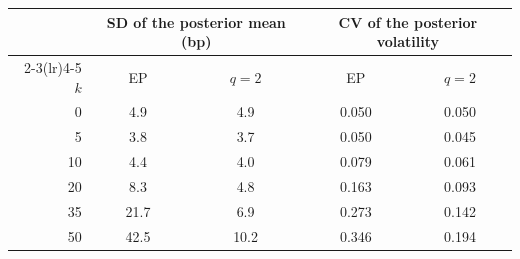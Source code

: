 \begin{tabular}{rcccc}
\toprule
 & \multicolumn{2}{c}{SD of the posterior mean (bp)} & \multicolumn{2}{c}{CV of the posterior volatility} \\
\cmidrule(lr){2-3}\cmidrule(lr){4-5}
$k$ & EP & $q=2$ & EP & $q=2$ \\
\midrule
0 & 4.9 & 4.9 & 0.050 & 0.050 \\
5 & 3.8 & 3.7 & 0.050 & 0.045 \\
10 & 4.4 & 4.0 & 0.079 & 0.061 \\
20 & 8.3 & 4.8 & 0.163 & 0.093 \\
35 & 21.7 & 6.9 & 0.273 & 0.142 \\
50 & 42.5 & 10.2 & 0.346 & 0.194 \\
\bottomrule
\end{tabular}

